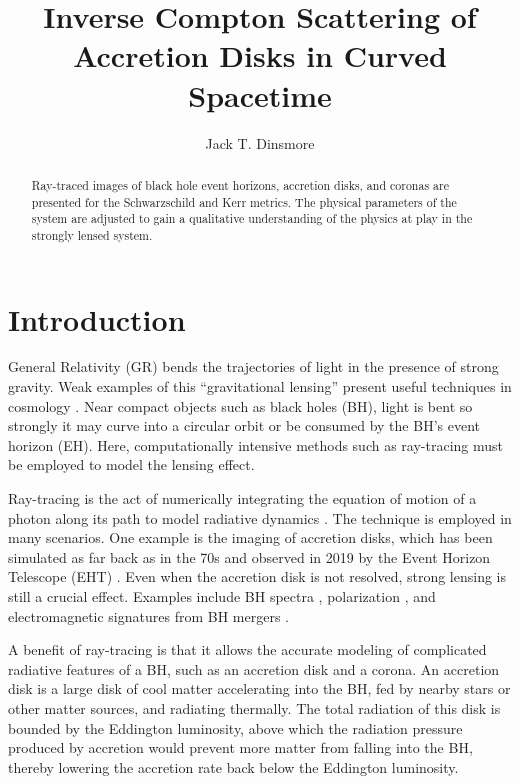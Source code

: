 \documentclass[twocolumn,twocolappendix]{aastex631}
\begin{document}
\author{Jack T. Dinsmore}
\title{Inverse Compton Scattering of Accretion Disks in Curved Spacetime}

\begin{abstract}
  Ray-traced images of black hole event horizons, accretion disks, and coronas are presented for the Schwarzschild and Kerr metrics. The physical parameters of the system are adjusted to gain a qualitative understanding of the physics at play in the strongly lensed system.
\end{abstract}

\section{Introduction}

General Relativity (GR) bends the trajectories of light in the presence of strong gravity. Weak examples of this ``gravitational lensing'' present useful techniques in cosmology \citep{blandford1992cosmological}. Near compact objects such as black holes (BH), light is bent so strongly it may curve into a circular orbit or be consumed by the BH's event horizon (EH). Here, computationally intensive methods such as ray-tracing must be employed to model the lensing effect.

Ray-tracing is the act of numerically integrating the equation of motion of a photon along its path to model radiative dynamics \citep{vincent2011gyoto}. The technique is employed in many scenarios. One example is the imaging of accretion disks, which has been simulated as far back as in the 70s \citep{luminet1979image} and observed in 2019 by the Event Horizon Telescope (EHT) \citep{collaboration2019first}. Even when the accretion disk is not resolved, strong lensing is still a crucial effect. Examples include BH spectra \citep{cunningham1975effects}, polarization \citep{dovvciak2008thermal}, and electromagnetic signatures from BH mergers \citep{d2018electromagnetic}.

A benefit of ray-tracing is that it allows the accurate modeling of complicated radiative features of a BH, such as an accretion disk and a corona. An accretion disk is a large disk of cool matter accelerating into the BH, fed by nearby stars or other matter sources, and radiating thermally. The total radiation of this disk is bounded by the Eddington luminosity, above which the radiation pressure produced by accretion would prevent more matter from falling into the BH, thereby lowering the accretion rate back below the Eddington luminosity.
\end{document}
